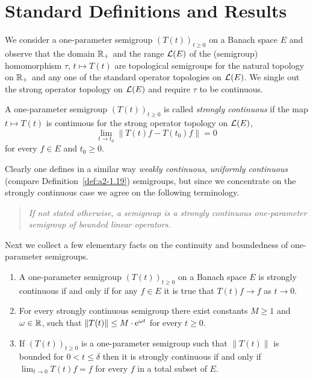 \section{Standard Definitions and Results}\label{sec:a1-1}%
We consider a one-parameter semigroup $(T(t))_{t \geq 0}$ on a Banach space $E$ and observe that the domain $\mathbb{R}_{+}$ and the range $\mathcal{L}(E)$ of the (semigroup) homomorphism $\tau $, $ t \mapsto T(t)$ are topological semigroups for the natural topology on $\mathbb{R}_{+}$ and any one of the standard operator topologies on $\mathcal{L}(E)$.
We single out the strong operator topology on $\mathcal{L}(E)$ and require $\tau$ to be continuous.
\begin{definition}\label{def:a1-1.1}
A one-parameter semigroup $(T(t))_{t\geq0}$ is called \emph{strongly continuous} if the map $t \mapsto T(t)$ is continuous for the strong operator topology on $\mathcal{L}(E)$, \ie
\[
	\lim_{t\to t_{0}} \|T(t)f - T(t_{0})f\| = 0
\]
for every $f \in E$ and $t_{0} \geq 0$.
\end{definition}
Clearly one defines in a similar way \emph{weakly continuous}, \resp \emph{uniformly continuous} (compare Definition~\ref{def:a2-1.19}) semigroups, but since we concentrate on the strongly continuous case we agree on the following terminology.
\begin{quote}
\textit{If not stated otherwise, a \emph{semigroup} is a strongly continuous one-parameter semigroup of bounded linear operators. }
\end{quote}
Next we collect a few elementary facts on the continuity and boundedness of one-parameter semigroups.
\begin{remarks}\label{rem:a1-1.2}
\begin{enumerate}[\upshape(i), wide, labelindent=.25em]

\item 
A one-parameter semigroup $(T(t))_{t \geq 0}$ on a Banach space $E$ is strongly continuous if and only if for any $f \in E$ it is true that $T(t)f \to f$ as $t \to 0$.

\item 
For every strongly continuous semigroup there exist constants $ M \geq 1 $ and $ \omega \in \mathbb{R} $, such that 
$ \lVert T(t) \rVert \leq M \cdot \eu^{ \omega t} $ for every $  t \geq 0 $.

\item If\/ $ (T(t))_{t\geq0} $ is a one-parameter semigroup such that $ \lVert T(t) \rVert $ is bounded for
$ 0 < t \leq \delta $ then it is strongly continuous if and only if\/ $ \lim_{t\to0} T(t)f = f $ for every $ f $ in a total subset of\/ $ E $.

\end{enumerate}
\end{remarks}
